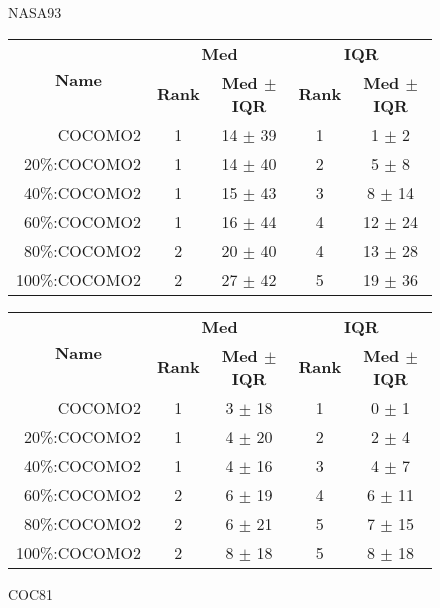 \begin{figure}[!t]
\begin{center}
\caption{NASA93}
\scriptsize
\label{fig:nasa93}
\begin{tabular}{|r|c|c|c|c|}
\hline
\multicolumn{1}{|c|}{\multirow{2}{*}{\textbf{Name}}} & \multicolumn{2}{c|}{\textbf{Med}}     & \multicolumn{2}{c|}{\textbf{IQR}} \\ \cline{2-5} 
\multicolumn{1}{|c|}{}                               & \textbf{Rank} & \textbf{Med $\pm$ IQR} & \textbf{Rank} & \textbf{Med $\pm$ IQR} \\ \hline
    COCOMO2  & 1 & 14 $\pm$ 39   & 1    & 1 $\pm$ 2     \\ \cline{4-5}
20\%:COCOMO2 & 1 & 14 $\pm$ 40   & 2    & 5 $\pm$ 8   \\ \cline{4-5}
40\%:COCOMO2 & 1 & 15 $\pm$ 43   & 3    & 8 $\pm$ 14   \\ \cline{4-5}
60\%:COCOMO2 & 1 & 16 $\pm$ 44   & 4    & 12 $\pm$ 24   \\ \cline{2-3}
80\%:COCOMO2 & 2 & 20 $\pm$ 40   & 4    & 13 $\pm$ 28   \\\cline{4-5}
100\%:COCOMO2 & 2 & 27 $\pm$ 42  & 5    & 19 $\pm$ 36    \\ \hline  
\end{tabular}

\caption{COC81}
\scriptsize
\label{fig:coc81}
\begin{tabular}{|r|c|c|c|c|}
\hline
\multicolumn{1}{|c|}{\multirow{2}{*}{\textbf{Name}}} & \multicolumn{2}{c|}{\textbf{Med}}     & \multicolumn{2}{c|}{\textbf{IQR}} \\ \cline{2-5} 
\multicolumn{1}{|c|}{}                               & \textbf{Rank} & \textbf{Med $\pm$ IQR} & \textbf{Rank} & \textbf{Med $\pm$ IQR} \\ \hline
    COCOMO2  & 1 & 3 $\pm$ 18   & 1    & 0 $\pm$ 1     \\ \cline{4-5}
20\%:COCOMO2 & 1 & 4 $\pm$ 20   & 2    & 2 $\pm$ 4   \\ \cline{4-5}
40\%:COCOMO2 & 1 & 4 $\pm$ 16   & 3    & 4 $\pm$ 7   \\ \cline{2-5}
60\%:COCOMO2 & 2 & 6 $\pm$ 19   & 4    & 6 $\pm$ 11   \\ \cline{4-5}
80\%:COCOMO2 & 2 & 6 $\pm$ 21   & 5    & 7 $\pm$ 15   \\
100\%:COCOMO2 & 2 & 8 $\pm$ 18  & 5    & 8 $\pm$ 18    \\ \hline        
\end{tabular}
\end{center}
\end{figure}